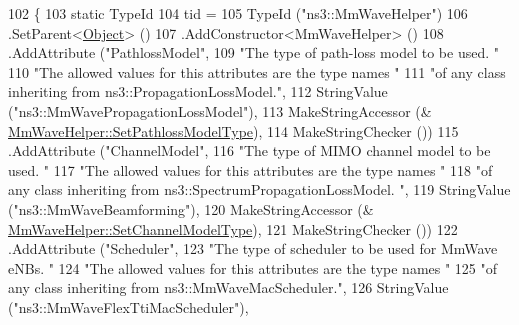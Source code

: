 \begin{DoxyCode}
102 \{
103         \textcolor{keyword}{static} TypeId
104             tid =
105             TypeId (\textcolor{stringliteral}{"ns3::MmWaveHelper"})
106             .SetParent<\hyperlink{classns3_1_1Object_a40860402e64d8008fb42329df7097cdb}{Object}> ()
107             .AddConstructor<MmWaveHelper> ()
108                 .AddAttribute (\textcolor{stringliteral}{"PathlossModel"},
109                                            \textcolor{stringliteral}{"The type of path-loss model to be used. "}
110                                            \textcolor{stringliteral}{"The allowed values for this attributes are the type names "}
111                                            \textcolor{stringliteral}{"of any class inheriting from ns3::PropagationLossModel."},
112                                            StringValue (\textcolor{stringliteral}{"ns3::MmWavePropagationLossModel"}),
113                                            MakeStringAccessor (&
      \hyperlink{classns3_1_1MmWaveHelper_a06ba80bdb947494937d88293085fdae3}{MmWaveHelper::SetPathlossModelType}),
114                                            MakeStringChecker ())
115                 .AddAttribute (\textcolor{stringliteral}{"ChannelModel"},
116                                            \textcolor{stringliteral}{"The type of MIMO channel model to be used. "}
117                                            \textcolor{stringliteral}{"The allowed values for this attributes are the type names "}
118                                            \textcolor{stringliteral}{"of any class inheriting from ns3::SpectrumPropagationLossModel.
      "},
119                                            StringValue (\textcolor{stringliteral}{"ns3::MmWaveBeamforming"}),
120                                            MakeStringAccessor (&
      \hyperlink{classns3_1_1MmWaveHelper_a9ea4a1719352f4f98f97981782c4a5e0}{MmWaveHelper::SetChannelModelType}),
121                                            MakeStringChecker ())
122                 .AddAttribute (\textcolor{stringliteral}{"Scheduler"},
123                                       \textcolor{stringliteral}{"The type of scheduler to be used for MmWave eNBs. "}
124                                       \textcolor{stringliteral}{"The allowed values for this attributes are the type names "}
125                                       \textcolor{stringliteral}{"of any class inheriting from ns3::MmWaveMacScheduler."},
126                                       StringValue (\textcolor{stringliteral}{"ns3::MmWaveFlexTtiMacScheduler"}),

\end{DoxyCode}
